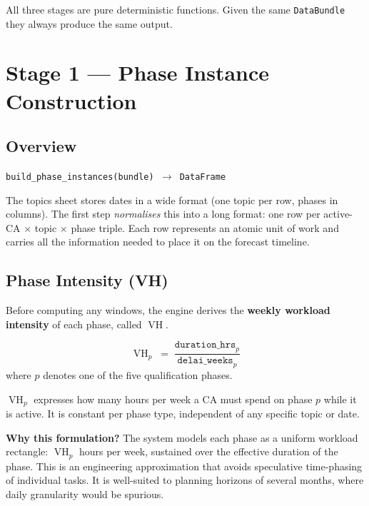 \documentclass[12pt,a4paper]{report}
\DeclareMathOperator{\vh}{VH}
\begin{document}
All three stages are pure deterministic functions. Given the same
\texttt{DataBundle} they always produce the same output.

\section{Stage 1 --- Phase Instance Construction}
\label{sec:phase-instances}

\subsection{Overview}

\texttt{build\_phase\_instances(bundle) $\to$ DataFrame}

The topics sheet stores dates in a wide format (one topic per row,
phases in columns). The first step \textit{normalises} this into a long
format: one row per active-CA $\times$ topic $\times$ phase triple.
Each row represents an atomic unit of work and carries all the
information needed to place it on the forecast timeline.

\subsection{Phase Intensity (VH)}
\label{sec:vh}

Before computing any windows, the engine derives the \textbf{weekly
workload intensity} of each phase, called $\vh$.

\begin{tcolorbox}[defbox, title={Definition: Workload Intensity $\vh$}]
\[
  \vh_p \;=\; \frac{\texttt{duration\_hrs}_p}{\texttt{delai\_weeks}_p}
\]
where $p$ denotes one of the five qualification phases.
\end{tcolorbox}

$\vh_p$ expresses how many hours per week a CA must spend on phase $p$
while it is active. It is constant per phase type, independent of
any specific topic or date.

\textbf{Why this formulation?}
The system models each phase as a uniform workload rectangle: $\vh_p$
hours per week, sustained over the effective duration of the phase.
This is an engineering approximation that avoids speculative
time-phasing of individual tasks. It is well-suited to planning
horizons of several months, where daily granularity would be spurious.
\end{document}
